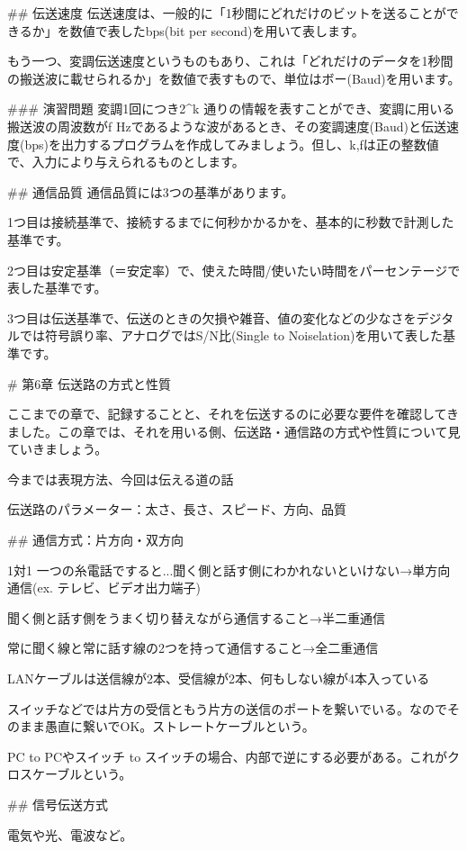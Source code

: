 ## 伝送速度
伝送速度は、一般的に「1秒間にどれだけのビットを送ることができるか」を数値で表したbps(bit per second)を用いて表します。

もう一つ、変調伝送速度というものもあり、これは「どれだけのデータを1秒間の搬送波に載せられるか」を数値で表すもので、単位はボー(Baud)を用います。

### 演習問題
変調1回につき2^k 通りの情報を表すことができ、変調に用いる搬送波の周波数がf Hzであるような波があるとき、その変調速度(Baud)と伝送速度(bps)を出力するプログラムを作成してみましょう。但し、k,fは正の整数値で、入力により与えられるものとします。

## 通信品質
通信品質には3つの基準があります。

1つ目は接続基準で、接続するまでに何秒かかるかを、基本的に秒数で計測した基準です。

2つ目は安定基準（＝安定率）で、使えた時間/使いたい時間をパーセンテージで表した基準です。

3つ目は伝送基準で、伝送のときの欠損や雑音、値の変化などの少なさをデジタルでは符号誤り率、アナログではS/N比(Single to Noiselation)を用いて表した基準です。


# 第6章 伝送路の方式と性質

ここまでの章で、記録することと、それを伝送するのに必要な要件を確認してきました。この章では、それを用いる側、伝送路・通信路の方式や性質について見ていきましょう。

今までは表現方法、今回は伝える道の話

伝送路のパラメーター：太さ、長さ、スピード、方向、品質


## 通信方式：片方向・双方向

1対1
一つの糸電話ですると...聞く側と話す側にわかれないといけない→単方向通信(ex. テレビ、ビデオ出力端子)

聞く側と話す側をうまく切り替えながら通信すること→半二重通信

常に聞く線と常に話す線の2つを持って通信すること→全二重通信

LANケーブルは送信線が2本、受信線が2本、何もしない線が4本入っている

スイッチなどでは片方の受信ともう片方の送信のポートを繋いでいる。なのでそのまま愚直に繋いでOK。ストレートケーブルという。

PC to PCやスイッチ to スイッチの場合、内部で逆にする必要がある。これがクロスケーブルという。

## 信号伝送方式

電気や光、電波など。

